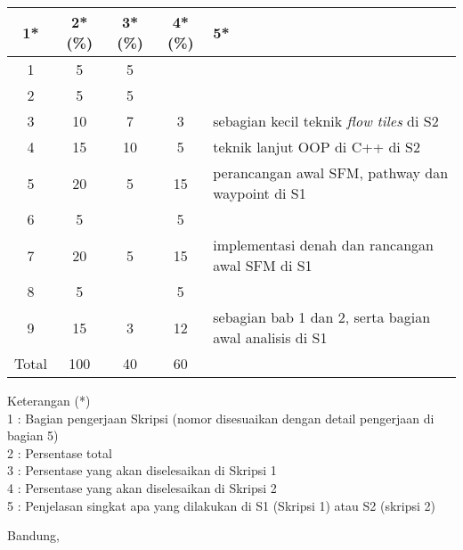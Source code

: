 \documentclass[a4paper,twoside]{article}
\begin{document}
\begin{center}
  \begin{tabular}{ | c | c | c | c | l |}
    \hline
    1*  & 2*(\%) & 3*(\%) & 4*(\%) &5*\\ \hline \hline
    1   & 5  & 5  &  &  \\ \hline
    2   & 5 & 5  &   & \\ \hline
    3   & 10  & 7  & 3 & {\footnotesize sebagian kecil teknik {\it flow tiles} di S2}  \\ \hline
    4   & 15  & 10  &  5 & {\footnotesize teknik lanjut OOP di C++ di S2} \\ \hline
    5   & 20  & 5  & 15 & {\footnotesize perancangan awal SFM, pathway dan waypoint di S1} \\ \hline
    6   & 5 &   & 5  & \\ \hline
    7   & 20  & 5  & 15 &  {\footnotesize implementasi denah dan rancangan awal SFM di S1}\\ \hline
    8   & 5  &   &  5  & \\ \hline
    9   & 15  & 3  & 12  & {\footnotesize sebagian bab 1 dan 2, serta bagian awal analisis di S1}\\ \hline
    Total  & 100  & 40  & 60 &  \\ \hline
                          \end{tabular}
\end{center}

Keterangan (*)\\
1 : Bagian pengerjaan Skripsi (nomor disesuaikan dengan detail pengerjaan di bagian 5)\\
2 : Persentase total \\
3 : Persentase yang akan diselesaikan di Skripsi 1 \\
4 : Persentase yang akan diselesaikan di Skripsi 2 \\
5 : Penjelasan singkat apa yang dilakukan di S1 (Skripsi 1) atau S2 (skripsi 2)

\vspace{1cm}
\centering Bandung, \tanggal\\
\vspace{2cm} \nama \\ 
\vspace{1cm}
\end{document}
